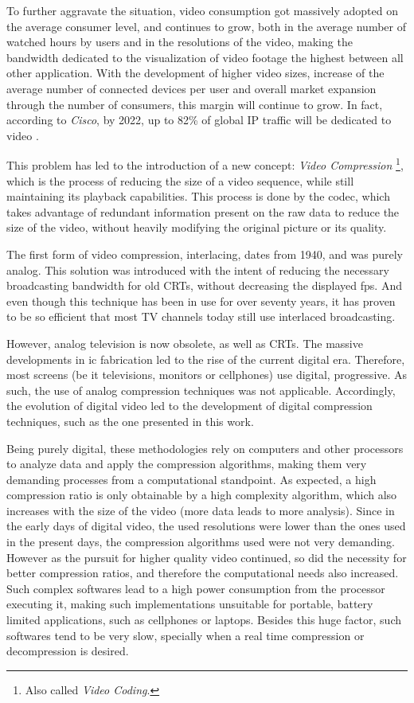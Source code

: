 To further aggravate the situation, video consumption got massively adopted on the average consumer level, and continues to grow, both in the average number of watched hours by users and in the resolutions of the video, making the bandwidth dedicated to the visualization of video footage the highest between all other application. With the development of higher video sizes, increase of the average number of connected devices per user and overall market expansion through the number of consumers, this margin will continue to grow. In fact, according to \emph{Cisco}, by 2022, up to 82\% of global IP traffic will be dedicated to video \cite[Trends~1~\&~4]{CiscoVisualNetworking}.

This problem has led to the introduction of a new concept: \emph{Video Compression} \footnote{Also called \textit{Video Coding}.}, which is the process of reducing the size of a video sequence, while still maintaining its playback capabilities. This process is done by the \Gls{codec}, which takes advantage of redundant information present on the raw data to reduce the size of the video, without heavily modifying the original picture or its quality. 

The first form of video compression, \gls{interlacing}, dates from 1940, and was purely analog. This solution was introduced with the intent of reducing the necessary broadcasting bandwidth for old CRTs, without decreasing the displayed fps. And even though this technique has been in use for over seventy years, it has proven to be so efficient that most TV channels today still use interlaced broadcasting.

However, analog television is now obsolete, as well as CRTs. The massive developments in \Gls{ic} fabrication led to the rise of the current digital era. Therefore, most screens (be it televisions, monitors or cellphones) use digital, \gls{progressive}. As such, the use of analog compression techniques was not applicable. Accordingly, the evolution of digital video led to the development of digital compression techniques, such as the one presented in this work.

Being purely digital, these methodologies rely on computers and other processors to analyze data and apply the compression algorithms, making them very demanding processes from a computational standpoint. As expected, a high compression ratio is only obtainable by a high complexity algorithm, which also increases with the size of the video (more data leads to more analysis). Since in the early days of digital video, the used resolutions were lower than the ones used in the present days, the compression algorithms used were not very demanding. However as the pursuit for higher quality video continued, so did the necessity for better compression ratios, and therefore the computational needs also increased. Such complex softwares lead to a high power consumption from the processor executing it, making such implementations unsuitable for portable, battery limited applications, such as cellphones or laptops. Besides this huge factor, such softwares tend to be very slow, specially when a real time compression or decompression is desired.

